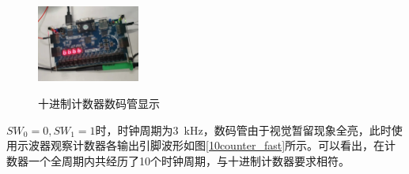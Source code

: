 \documentclass[UTF8]{ctexart}
\numberwithin{figure}{subsection}
\numberwithin{table}{subsection}
\numberwithin{equation}{subsection}
\begin{document}
\begin{figure}[H]
{    \includegraphics[width=0.3\textwidth]{original pic/6.jpg}}
    
    \caption{十进制计数器数码管显示}
    \label{10counter_slow}
\end{figure}

\(SW_0 =0 ,  SW_1 = 1\)时，时钟周期为\SI{3}{\kHz}，数码管由于视觉暂留现象全亮，此时使用示波器观察计数器各输出引脚波形如图\ref{10counter_fast}所示。可以看出，在计数器一个全周期内共经历了10个时钟周期，与十进制计数器要求相符。
\end{document}
